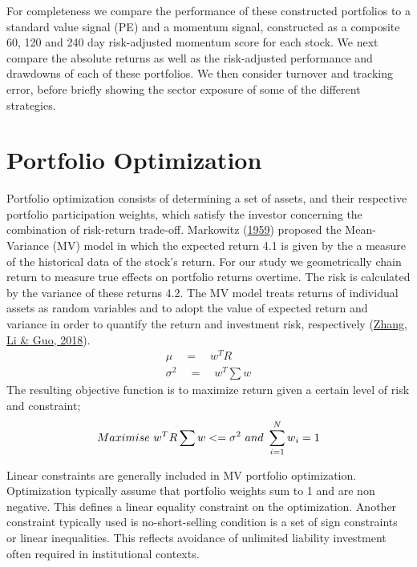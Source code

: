 \documentclass[11pt,preprint, authoryear]{elsarticle}
\numberwithin{equation}{section}
\numberwithin{figure}{section}
\numberwithin{table}{section}
\begin{document}
For completeness we compare the performance of these constructed
portfolios to a standard value signal (PE) and a momentum signal,
constructed as a composite 60, 120 and 240 day risk-adjusted momentum
score for each stock. We next compare the absolute returns as well as
the risk-adjusted performance and drawdowns of each of these portfolios.
We then consider turnover and tracking error, before briefly showing the
sector exposure of some of the different strategies.

\hypertarget{portfolio-optimization}{%
\section*{Portfolio Optimization}\label{portfolio-optimization}}

Portfolio optimization consists of determining a set of assets, and
their respective portfolio participation weights, which satisfy the
investor concerning the combination of risk-return trade-off. Markowitz
(\protect\hyperlink{ref-markowitz1959portfolio}{1959}) proposed the
Mean-Variance (MV) model in which the expected return 4.1 is given by
the a measure of the historical data of the stock's return. For our
study we geometrically chain return to measure true effects on portfolio
returns overtime. The risk is calculated by the variance of these
returns 4.2. The MV model treats returns of individual assets as random
variables and to adopt the value of expected return and variance in
order to quantify the return and investment risk, respectively
(\protect\hyperlink{ref-zhang2018portfolio}{Zhang, Li \& Guo, 2018}).
\begin{align}
 \mu \quad = \quad w^TR \\ 
\sigma^2 \quad  = \quad w^T\sum 
w\end{align} The resulting objective function is to maximize return
given a certain level of risk and constraint; \begin{align}
Maximise \ w^TR \sum w<=\sigma^2\ and\ \sum_{i = 1}^{N}w{_i}=1 \notag
\end{align}

Linear constraints are generally included in MV portfolio optimization.
Optimization typically assume that portfolio weights sum to 1 and are
non negative. This defines a linear equality constraint on the
optimization. Another constraint typically used is no-short-selling
condition is a set of sign constraints or linear inequalities. This
reflects avoidance of unlimited liability investment often required in
institutional contexts.
\end{document}
